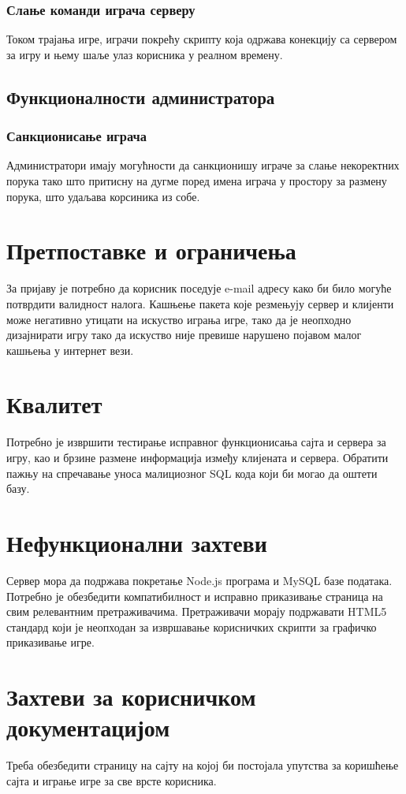 \subsubsection{Слање команди играча серверу}
Током трајања игре, играчи покрећу скрипту која одржава конекцију са сервером за игру и њему шаље улаз корисника у реалном времену.

\subsection{Функционалности администратора}

\subsubsection{Санкционисање играча}
Администратори имају могућности да санкционишу играче за слање некоректних порука тако што притисну на дугме поред имена играча у простору за размену порука, што удаљава корсиника из собе.

\section{Претпоставке и ограничења}
За пријаву је потребно да корисник поседује e-mail адресу како би било могуће потврдити валидност налога.
Кашњење пакета које резмењују сервер и клијенти може негативно утицати на искуство играња игре, тако да је неопходно дизајнирати игру тако да искуство није превише нарушено појавом малог кашњења у интернет вези.

\section{Квалитет}
Потребно је извршити тестирање исправног функционисања сајта и сервера за игру, као и брзине размене информација између клијената и сервера. Обратити пажњу на спречавање уноса малициозног SQL кода који би могао да оштети базу.

\section{Нефункционални захтеви}
Сервер мора да подржава покретање Node.js програма и MySQL базе података. Потребно је обезбедити компатибилност и исправно приказивање страница на свим релевантним претраживачима. Претраживачи морају подржавати HTML5 стандард који је неопходан за извршавање корисничких скрипти за графичко приказивање игре.

\section{Захтеви за корисничком документацијом}
Треба обезбедити страницу на сајту на којој би постојала упутства за коришћење сајта и играње игре за све врсте корисника.

